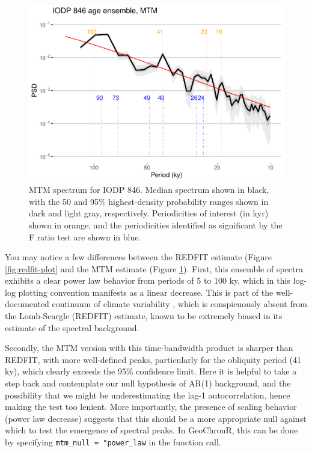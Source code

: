 \documentclass[gchron, manuscript]{copernicus}
\begin{document}
\begin{figure}
\includegraphics[width=12cm]{geoChronR-paper_files/figure-latex/mtm-ensemble-export-1} \caption{MTM spectrum for IODP 846. Median spectrum shown in black, with the 50 and 95\% highest-density probability ranges shown in dark and light gray, respectively. Periodicities of interest (in kyr) shown in orange, and the periodicities identified as significant by the F ratio test are shown in blue.}\label{fig:mtm-ensemble-export}
\end{figure}

You may notice a few differences between the REDFIT estimate (Figure \ref{fig:redfit-plot} and the MTM estimate (Figure \ref{fig:mtm-ensemble-export}).
First, this ensemble of spectra exhibits a clear power law behavior from periods of 5 to 100 ky, which in this log-log plotting convention manifests as a linear decrease.
This is part of the well-documented continuum of climate variability \citep[\citet{ZhuPNAS2019}]{Huybers_Curry2006}, which is conspicuously absent from the Lomb-Scargle (REDFIT) estimate, known to be extremely biased in its estimate of the spectral background.

Secondly, the MTM version with this time-bandwidth product is sharper than REDFIT, with more well-defined peaks, particularly for the obliquity period (41 ky), which clearly exceeds the 95\% confidence limit.
Here it is helpful to take a step back and contemplate our null hypothesis of AR(1) background, and the possibility that we might be underestimating the lag-1 autocorrelation, hence making the test too lenient.
More importantly, the presence of scaling behavior (power law decrease) suggests that this should be a more appropriate null against which to test the emergence of spectral peaks.
In GeoChronR, this can be done by specifying \texttt{mtm\_null\ =\ "power\_law} in the function call.
\end{document}
